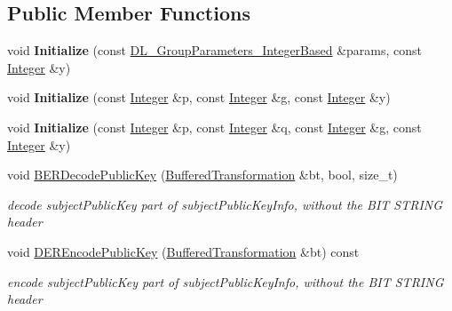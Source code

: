 \subsection*{Public Member Functions}
\begin{DoxyCompactItemize}
\item 
\hypertarget{class_d_l___public_key___g_f_p_a06b9c78e45b40b6a5bdf3f3bb5a9b806}{
void {\bfseries Initialize} (const \hyperlink{class_d_l___group_parameters___integer_based}{DL\_\-GroupParameters\_\-IntegerBased} \&params, const \hyperlink{class_integer}{Integer} \&y)}
\label{class_d_l___public_key___g_f_p_a06b9c78e45b40b6a5bdf3f3bb5a9b806}

\item 
\hypertarget{class_d_l___public_key___g_f_p_a3488c76b9b7aa9b78ef83bc30b546c6d}{
void {\bfseries Initialize} (const \hyperlink{class_integer}{Integer} \&p, const \hyperlink{class_integer}{Integer} \&g, const \hyperlink{class_integer}{Integer} \&y)}
\label{class_d_l___public_key___g_f_p_a3488c76b9b7aa9b78ef83bc30b546c6d}

\item 
\hypertarget{class_d_l___public_key___g_f_p_adf536d6b1f23579db94bf563b8af45eb}{
void {\bfseries Initialize} (const \hyperlink{class_integer}{Integer} \&p, const \hyperlink{class_integer}{Integer} \&q, const \hyperlink{class_integer}{Integer} \&g, const \hyperlink{class_integer}{Integer} \&y)}
\label{class_d_l___public_key___g_f_p_adf536d6b1f23579db94bf563b8af45eb}

\item 
\hypertarget{class_d_l___public_key___g_f_p_a9776ea4e0c4629e9e699145e0cf20d36}{
void \hyperlink{class_d_l___public_key___g_f_p_a9776ea4e0c4629e9e699145e0cf20d36}{BERDecodePublicKey} (\hyperlink{class_buffered_transformation}{BufferedTransformation} \&bt, bool, size\_\-t)}
\label{class_d_l___public_key___g_f_p_a9776ea4e0c4629e9e699145e0cf20d36}

\begin{DoxyCompactList}\small\item\em decode subjectPublicKey part of subjectPublicKeyInfo, without the BIT STRING header \item\end{DoxyCompactList}\item 
\hypertarget{class_d_l___public_key___g_f_p_a132a1c79c696cb4589e08e5f448df6d0}{
void \hyperlink{class_d_l___public_key___g_f_p_a132a1c79c696cb4589e08e5f448df6d0}{DEREncodePublicKey} (\hyperlink{class_buffered_transformation}{BufferedTransformation} \&bt) const }
\label{class_d_l___public_key___g_f_p_a132a1c79c696cb4589e08e5f448df6d0}

\begin{DoxyCompactList}\small\item\em encode subjectPublicKey part of subjectPublicKeyInfo, without the BIT STRING header \item\end{DoxyCompactList}\end{DoxyCompactItemize}


